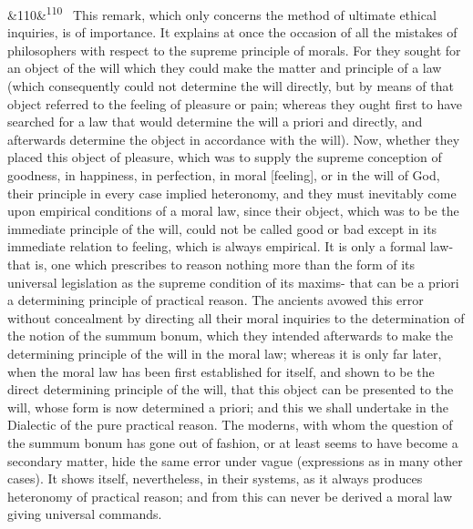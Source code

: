 \documentclass[12pt]{article}
\newcommand{\para}[1][]{\par\noindent\ifx&#1&\else\textsuperscript{\footnotesize #1}~\fi}
\begin{document}
\para[110] This remark, which only concerns the method of ultimate ethical inquiries, is of importance. It explains at once the occasion of all the mistakes of philosophers with respect to the supreme principle of morals. For they sought for an object of the will which they could make the matter and principle of a law (which consequently could not determine the will directly, but by means of that object referred to the feeling of pleasure or pain; whereas they ought first to have searched for a law that would determine the will a priori and directly, and afterwards determine the object in accordance with the will). Now, whether they placed this object of pleasure, which was to supply the supreme conception of goodness, in happiness, in perfection, in moral [feeling], or in the will of God, their principle in every case implied heteronomy, and they must inevitably come upon empirical conditions of a moral law, since their object, which was to be the immediate principle of the will, could not be called good or bad except in its immediate relation to feeling, which is always empirical. It is only a formal law- that is, one which prescribes to reason nothing more than the form of its universal legislation as the supreme condition of its maxims- that can be a priori a determining principle of practical reason. The ancients avowed this error without concealment by directing all their moral inquiries to the determination of the notion of the summum bonum, which they intended afterwards to make the determining principle of the will in the moral law; whereas it is only far later, when the moral law has been first established for itself, and shown to be the direct determining principle of the will, that this object can be presented to the will, whose form is now determined a priori; and this we shall undertake in the Dialectic of the pure practical reason. The moderns, with whom the question of the summum bonum has gone out of fashion, or at least seems to have become a secondary matter, hide the same error under vague (expressions as in many other cases). It shows itself, nevertheless, in their systems, as it always produces heteronomy of practical reason; and from this can never be derived a moral law giving universal commands.
\end{document}
